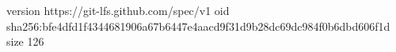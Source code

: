 version https://git-lfs.github.com/spec/v1
oid sha256:bfe4dfd1f4344681906a67b6447e4aacd9f31d9b28dc69dc984f0b6dbd606f1d
size 126
